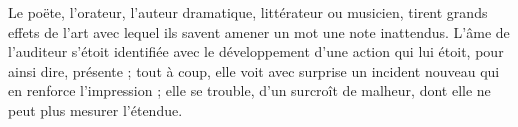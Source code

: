 \documentclass[11pt,a4paper]{article}
\begin{document}
Le poëte, l'orateur, l'auteur dramatique, littérateur ou musicien, tirent
 grands effets de l'art avec lequel ils savent amener un
mot une note inattendus. L'âme de l'auditeur s'étoit identifiée avec le
développement d'une action qui lui étoit, pour ainsi dire, présente ;
tout à coup, elle voit avec surprise un incident nouveau qui en renforce
 l'impression ; elle se trouble,  d'un
surcroît de malheur, dont elle ne peut plus mesurer
l'étendue.
\end{document}
